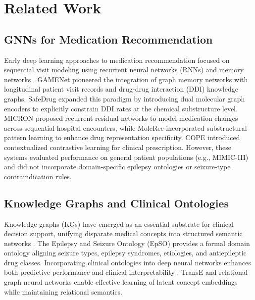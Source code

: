 \documentclass[11pt,a4paper]{article}
\begin{document}
\section{Related Work}

\subsection{GNNs for Medication Recommendation}
Early deep learning approaches to medication recommendation focused on sequential visit modeling using recurrent neural networks (RNNs) and memory networks \cite{le2018dual, choi2016doctor}. GAMENet \cite{shang2019gamenet} pioneered the integration of graph memory networks with longitudinal patient visit records and drug-drug interaction (DDI) knowledge graphs. SafeDrug \cite{yang2021safedrug} expanded this paradigm by introducing dual molecular graph encoders to explicitly constrain DDI rates at the chemical substructure level. MICRON \cite{yang2021micron} proposed recurrent residual networks to model medication changes across sequential hospital encounters, while MoleRec \cite{yang2023molerec} incorporated substructural pattern learning to enhance drug representation specificity. COPE \cite{zhang2023cope} introduced contextualized contrastive learning for clinical prescription. However, these systems evaluated performance on general patient populations (e.g., MIMIC-III) and did not incorporate domain-specific epilepsy ontologies or seizure-type contraindication rules.

\subsection{Knowledge Graphs and Clinical Ontologies}
Knowledge graphs (KGs) have emerged as an essential substrate for clinical decision support, unifying disparate medical concepts into structured semantic networks \cite{rotmensch2017learning, sun2020medical, zhao2022ehr}. The Epilepsy and Seizure Ontology (EpSO) \cite{sahoo2014epso} provides a formal domain ontology aligning seizure types, epilepsy syndromes, etiologies, and antiepileptic drug classes. Incorporating clinical ontologies into deep neural networks enhances both predictive performance and clinical interpretability \cite{choi2017gram, ji2021survey}. TransE \cite{bordes2013translating} and relational graph neural networks \cite{schlichtkrull2018modeling} enable effective learning of latent concept embeddings while maintaining relational semantics.
\end{document}
